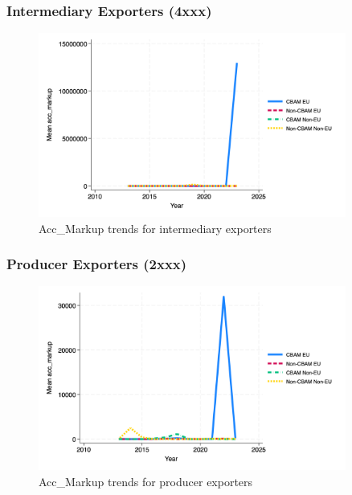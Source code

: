 \documentclass{article}
\begin{document}
\subsubsection{Intermediary Exporters (4xxx)}
\begin{figure}[h!]
\centering
\includegraphics[width=0.9\textwidth]{acc_markup_ei.png}
\caption{Acc_Markup trends for intermediary exporters}
\label{fig:acc_markup_ei}
\end{figure}

\subsubsection{Producer Exporters (2xxx)}
\begin{figure}[h!]
\centering
\includegraphics[width=0.9\textwidth]{acc_markup_ep.png}
\caption{Acc_Markup trends for producer exporters}
\label{fig:acc_markup_ep}
\end{figure}
\end{document}
